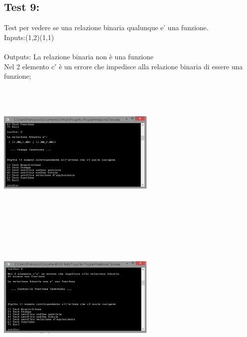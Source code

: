 \documentclass[11pt, a4paper, titlepage, block]{article}
\begin{document}
	\subsection{Test 9:}
	Test per vedere se una relazione binaria qualunque e' una funzione.\\
	Inputs:(1,2)(1,1)\\
	\\
	Outputs: La relazione binaria non \`e una funzione\\
	Nel 2 elemento c$'$ \`e un errore che impedisce alla relazione binaria di essere una funzione;\\
	\includegraphics[width=3in,height=3in,viewport=0 0 300 300]{../Screenshots/Test9Input.png}
	\\
	\includegraphics[width=3in,height=3in,viewport=0 0 300 300]{../Screenshots/Test9Output.PNG}
	\\
	\\
	\newpage
\end{document}
